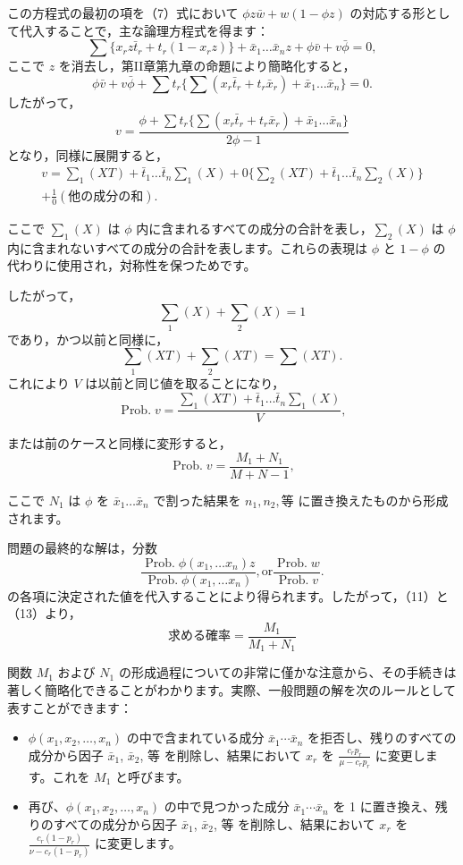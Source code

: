 \documentclass[a4paper,11pt,openany]{ltjsbook}
\begin{document}
この方程式の最初の項を（7）式において $\phi z\bar{w}+w(1-\phi z)$ の対応する形として代入することで，主な論理方程式を得ます：
\[
\sum \{x_r z \bar{t}_r + t_r(1-x_r z)\} + \bar{x}_1 \dotsc \bar{x}_n z + \phi \bar{v} + v \bar{\phi} = 0,
\]
ここで $z$ を消去し，第II章第九章の命題により簡略化すると，
\[
\phi \bar{v} + v \bar{\phi} + \sum t_r \{\sum (x_r\bar{t}_r + t_r\bar{x}_r) + \bar{x}_1 \dotsc \bar{x}_n\}=0.
\]
したがって，
\[
v = \frac{\phi + \sum t_r \{\sum(x_r\bar{t}_r + t_r\bar{x}_r) + \bar{x}_1 \dotsc \bar{x}_n\} }{2\phi-1}
\]
となり，同様に展開すると，
\[
\begin{split}
v = \sum\nolimits_1(XT)+\bar{t}_1\dotsc\bar{t}_n \sum\nolimits_1(X) + 0\{\sum\nolimits_2(XT)+\bar{t}_1\dotsc\bar{t}_n\sum\nolimits_2(X)\}
\\
+ \frac{1}{0}(\text{他の成分の和}).
\end{split}  \tag{12}
\]

ここで $\sum_1(X)$ は $\phi$ 内に含まれるすべての成分の合計を表し，$\sum_2(X)$ は $\phi$ 内に含まれないすべての成分の合計を表します。これらの表現は $\phi$ と $1-\phi$ の代わりに使用され，対称性を保つためです。

したがって，
\[
\sum_1(X)+\sum_2(X)=1
\]
であり，かつ以前と同様に，
\[
\sum_1(XT)+\sum_2(XT) = \sum(X T).
\]
これにより $V$ は以前と同じ値を取ることになり，
\[
\operatorname{Prob. } v
= \frac{\sum_1(XT)+\bar{t}_1\dotsc\bar{t}_n \sum_1(X)}{V},
\]

または前のケースと同様に変形すると，
\[
\operatorname{Prob. } v = \frac{M_1+N_1}{M+N-1},  \tag{13}
\]

ここで $N_1$ は $\phi$ を $\bar{x}_1\dotsc\bar{x}_n$ で割った結果を $n_1, n_2, 等$ に置き換えたものから形成されます。

問題の最終的な解は，分数
\[
\frac{\operatorname{Prob. } \phi(x_1,\dotsc x_n)z}
     {\operatorname{Prob. } \phi(x_1,\dotsc x_n)}, \mathrm{ or }
\frac{\operatorname{Prob. } w}{\operatorname{Prob. } v}.
\]
の各項に決定された値を代入することにより得られます。したがって，（11）と（13）より，
\[
\textrm{求める確率} = \frac{M_1}{M_1 + N_1}
\]

関数 $M_1$ および $N_1$ の形成過程についての非常に僅かな注意から、その手続きは著しく簡略化できることがわかります。実際、一般問題の解を次のルールとして表すことができます：

\begin{itemize}
    \item $\phi(x_1, x_2, \dotsc, x_n)$ の中で含まれている成分 $\bar{x}_1 \dotsm \bar{x}_n$ を拒否し、残りのすべての成分から因子 $\bar{x}_1$, $\bar{x}_2$, 等 を削除し、結果において $x_r$ を $\frac{c_r p_r}{\mu - c_r p_r}$ に変更します。これを $M_1$ と呼びます。
    \item 再び、$\phi(x_1, x_2, \dotsc, x_n)$ の中で見つかった成分 $\bar{x}_1 \dotsm \bar{x}_n$ を 1 に置き換え、残りのすべての成分から因子 $\bar{x}_1$, $\bar{x}_2$, 等 を削除し、結果において $x_r$ を $\frac{c_r (1-p_r)}{\nu - c_r (1-p_r)}$ に変更します。
\end{itemize}
\end{document}
